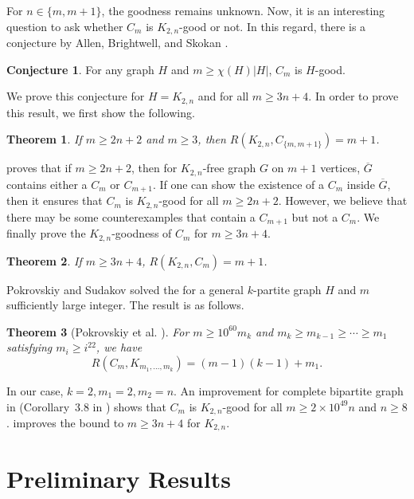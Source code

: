 \documentclass[12pt]{article}
\newtheorem{theorem}{Theorem}
\theoremstyle{definition}
\newtheorem{conjecture}{Conjecture}
\begin{document}
For $n\in\{m,m+1\}$, the goodness remains unknown. Now, it is an interesting question to ask whether $C_{m}$ is $K_{2,n}$-good or not. In this regard, there is a conjecture by Allen, Brightwell, and Skokan \cite{allen2013ramsey}.

\begin{conjecture}\label{conjecture}
   For any graph $H$ and $m\geq \chi(H)|H|$, $C_{m}$ is $H$-good.
\end{conjecture}
We prove this conjecture for $H=K_{2,n}$ and for all $m\geq 3n+4$. In order to prove this result, we first show the following.

\begin{theorem}\label{main theorem_2}
    If $m\geq 2n+2$ and $m\geq 3$, then $R(K_{2,n},C_{\{m,m+1\}})=m+1$.
\end{theorem}

 proves that if $m\geq 2n+2$, then for $K_{2,n}$-free graph $G$ on $m+1$ vertices, $\overline{G}$ contains either a $C_{m}$ or $C_{m+1}$. If one can show the existence of a $C_{m}$ inside $\overline{G}$, then it ensures that $C_{m}$ is $K_{2,n}$-good for all $m\geq 2n+2$. However, we believe that there may be some counterexamples that contain a $C_{m+1}$ but not a $C_{m}$. We finally prove the $K_{2,n}$-goodness of $C_{m}$ for $m\geq 3n+4$.

\begin{theorem}\label{main result_3}
    If $m\geq 3n+4$, $R(K_{2,n},C_{m})=m+1$.
\end{theorem}

Pokrovskiy and Sudakov\cite{pokrovskiy2020ramsey} solved the  for a general $k$-partite graph $H$ and $m$ sufficiently large integer. The result is as follows.

\begin{theorem}[Pokrovskiy et al. \cite{pokrovskiy2020ramsey}]\label{cycle goodness}
For $m \geq 10^{60} m_k$ and $m_k \geq m_{k-1} \geq \cdots \geq m_1$ satisfying $m_i \geq i^{22}$, we have
\[
R(C_m, K_{m_1,\ldots,m_k}) = (m - 1)(k - 1) + m_1.
\]
\end{theorem}

In our case, $k=2, m_{1}=2,m_{2}=n$. An improvement for complete bipartite graph in  (Corollary~3.8 in \cite{pokrovskiy2020ramsey}) shows that $C_{m}$ is $K_{2,n}$-good for all $m\geq 2\times10^{49}n$ and $n\geq 8$.  improves the bound to $m\geq 3n+4$ for $K_{2,n}$. 


\section{Preliminary Results}
\end{document}

